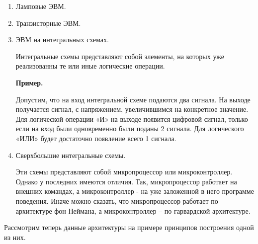 \documentclass[a4paper, fleqn]{article}
\newenvironment{example}[1][]{\medskip \noindent \textbf{Пример. #1}\par \nopagebreak}{\medskip \par} %
\begin{document}
		\begin{enumerate}
			\item Ламповые ЭВМ.
			
			
			\item Транзисторные ЭВМ.
			
			
			\item ЭВМ на интегральных схемах.
			
			Интегральные схемы представляют собой элементы, на которых уже реализованны те или иные логические операции.
			
			\begin{example}{}
				Допустим, что на вход интегральной схеме подаются два сигнала. На выходе получается сигнал, с напряжением, увеличившимся на конкретное значение. Для логической операции «И» на выходе появится цифровой сигнал, только если на вход были одновременно были поданы 2 сигнала. Для логического «ИЛИ» будет достаточно появление всего 1 сигнала.
			\end{example}
			
			\item Сверхбольшие интегральные схемы. 
			
			Эти схемы представляют собой микропроцессор или микроконтроллер. Однако у последних имеются отличия. Так, микропроцессор работает на внешних командах, а микроконтроллер - на уже заложенной в него программе поведения. Иначе можно сказать, что микропроцессор работает по архитектуре фон Неймана, а микроконтроллер -- по гарвардской архитектуре. 
				 
		\end{enumerate}
		
		Рассмотрим теперь данные архитектуры на примере принципов построения одной из них.
		
\end{document}
